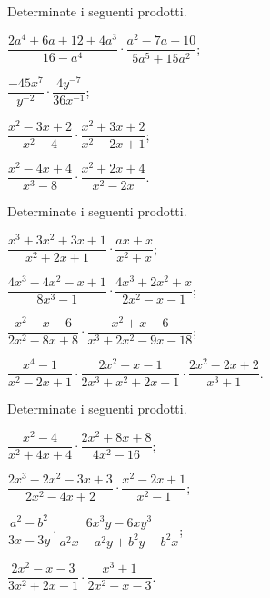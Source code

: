 \begin{esercizio}[\Ast]
\label{ese:14.14}
Determinate i seguenti prodotti.
\begin{multicols}{2}
\begin{enumeratea}
 \item $\dfrac{2a^{4}+6a+12+4a^{3}}{16-a^{4}}\cdot\dfrac{a^{2}-7a+10}{5a^{5}+15a^{2}}$;
 \item $\dfrac{-45x^{7}}{y^{-2}}\cdot\dfrac{4y^{-7}}{36x^{-1}}$;
 \item $\dfrac{x^{2}-3x+2}{x^{2}-4}\cdot\dfrac{x^{2}+3x+2}{x^{2}-2x+1}$;
 \item $\dfrac{x^{2}-4x+4}{x^{3}-8}\cdot\dfrac{x^{2}+2x+4}{x^{2}-2x}$.
\end{enumeratea}
\end{multicols}
\end{esercizio}

\begin{esercizio}[\Ast]
\label{ese:14.15}
Determinate i seguenti prodotti.
\begin{enumeratea}
 \item $\dfrac{x^{3}+3x^{2}+3x+1}{x^{2}+2x+1}\cdot \dfrac{ax+x}{x^{2}+x}$;
 \item $\dfrac{4x^{3}-4x^{2}-x+1}{8x^{3}-1}\cdot\dfrac{4x^{3}+2x^{2}+x}{2x^{2}-x-1}$;
 \item $\dfrac{x^{2}-x-6}{2x^{2}-8x+8}\cdot\dfrac{x^{2}+x-6}{x^{3}+2x^{2}-9x-18}$;
 \item $\dfrac{x^{4}-1}{x^{2}-2x+1}\cdot\dfrac{2x^{2}-x-1}{2x^{3}+x^{2}+2x+1}\cdot\dfrac{2x^{2}-2x+2}{x^{3}+1}$.
\end{enumeratea}
\end{esercizio}

\begin{esercizio}
\label{ese:14.16}
Determinate i seguenti prodotti.
\begin{multicols}{2}
\begin{enumeratea}
 \item $\dfrac{x^{2}-4}{x^{2}+4x+4}\cdot \dfrac{2x^{2}+8x+8}{4x^{2}-16}$;
 \item $\dfrac{2x^{3}-2x^{2}-3x+3}{2x^{2}-4x+2}\cdot{\dfrac{x^{2}-2x+1}{x^{2}-1}}$;
 \item $\dfrac{a^{2}-b^{2}}{3x-3y}\cdot {\dfrac{6x^{3}y-6xy^{3}}{a^{2}x-a^{2}y+b^{2}y-b^{2}x}}$;
 \item $\dfrac{2x^{2}-x-3}{3x^{2}+2x-1}\cdot {\dfrac{x^{3}+1}{2x^{2}-x-3}}$.
\end{enumeratea}
\end{multicols}
\end{esercizio}

